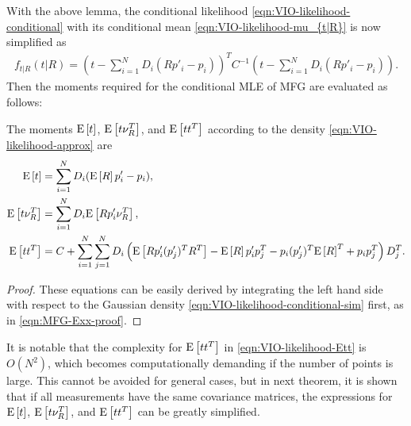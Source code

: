 With the above lemma, the conditional likelihood \eqref{eqn:VIO-likelihood-conditional} with its conditional mean \eqref{eqn:VIO-likelihood-mu_{t|R}} is now simplified as
\begin{align} \label{eqn:VIO-likelihood-conditional-sim}
	f_{t|R}(t|R) = \left( t - \sum_{i=1}^N D_i(Rp'_i - p_i) \right)^T C^{-1} \left( t - \sum_{i=1}^N D_i(Rp'_i - p_i) \right).
\end{align}
Then the moments required for the conditional MLE of MFG are evaluated as follows:

\begin{theorem} \label{thm:VIO-conditional}
	The moments $\mathrm{E}\left[ t \right]$, $\mathrm{E}\left[ t\nu_R^T \right]$, and $\mathrm{E}\left[ tt^T \right]$ according to the density \eqref{eqn:VIO-likelihood-approx} are
	\begin{align}
		\mathrm{E}\left[ t \right] &= \sum_{i=1}^N D_i(\mathrm{E}\left[ R \right]p'_i-p_i), \\
		\mathrm{E}\left[ t\nu_R^T \right] &= \sum_{i=1}^N D_i \mathrm{E}\left[ Rp'_i\nu_R^T \right], \\
		\mathrm{E}\left[ tt^T \right] &= C + \sum_{i=1}^N \sum_{j=1}^N D_i \left( \mathrm{E}\left[ Rp'_i(p'_j)^TR^T \right] - \mathrm{E}\left[ R \right]p'_ip_j^T - p_i(p'_j)^T\mathrm{E}\left[ R \right]^T + p_ip_j^T \right) D_j^T. \label{eqn:VIO-likelihood-Ett}
	\end{align}
\end{theorem}
\begin{proof}
	These equations can be easily derived by integrating the left hand side with respect to the Gaussian density \eqref{eqn:VIO-likelihood-conditional-sim} first, as in \eqref{eqn:MFG-Exx-proof}.
\end{proof}

It is notable that the complexity for $\mathrm{E}\left[ tt^T \right]$ in \eqref{eqn:VIO-likelihood-Ett} is $O(N^2)$, which becomes computationally demanding if the number of points is large.
This cannot be avoided for general cases, but in next theorem, it is shown that if all measurements have the same covariance matrices, the expressions for $\mathrm{E}\left[ t \right]$, $\mathrm{E}\left[ t\nu_R^T \right]$, and $\mathrm{E}\left[ tt^T \right]$ can be greatly simplified.


